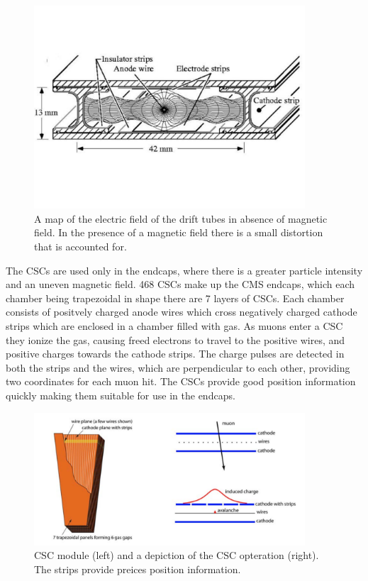 \begin{figure}[hbtp]
 \begin{center}
   \includegraphics[width=0.9\textwidth]{ch3_figs/cms_dt.pdf}
   \caption{A map of the electric field of the drift tubes in absence of magnetic field. In the presence of a magnetic field there is a small distortion that is accounted for.}
   \label{fig:cms_dt}
 \end{center}
\end{figure}

The CSCs are used only in the endcaps, where there is a greater particle intensity and an uneven magnetic field. 468 CSCs make up the CMS endcaps, which each chamber being trapezoidal in shape there are 7 layers of CSCs. Each chamber consists of positvely charged anode wires which cross negatively charged cathode strips which are enclosed in a chamber filled with gas. As muons enter a
CSC they ionize the gas, causing freed electrons to travel to the positive wires, and positive charges towards the cathode strips. The charge pulses are detected in both the strips
and the wires, which are perpendicular to each other, providing two coordinates for each muon hit. The CSCs provide good position information quickly making them suitable for use in the endcaps. 

\begin{figure}[hbtp]
 \begin{center}
   \includegraphics[width=0.9\textwidth]{ch3_figs/cms_csc.pdf}
   \caption{CSC module (left) and a depiction of the CSC opteration (right). The strips provide preices position information.}
   \label{fig:cms_csc}
 \end{center}
\end{figure}

